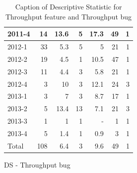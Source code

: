 \documentclass[UKenglish]{ifimaster}  %
\begin{document}
\begin{appendices}
\begin{table}[!htbp]
\begin{adjustwidth}{-2.5cm}{}
\begin{subfigure}[b]{0.3\textwidth}
{\begin{tabular}{ | l | r | r | r | r | r | r | }
 2011-4  & 14 & 13.6 & 5 & 17.3 & 49 & 1 \\ \hline
 2012-1  & 33 & 5.3 & 5 & 5 & 21 & 1 \\ \hline
 2012-2  & 19 & 4.5 & 1 & 10.5 & 47 & 1 \\ \hline
 2012-3  & 11 & 4.4 & 3 & 5.8 & 21 & 1 \\ \hline
 2012-4  & 3 & 10 & 3 & 12.1 & 24 & 3 \\ \hline
 2013-1  & 3 & 7 & 3 & 8.7 & 17 & 1 \\ \hline
 2013-2  & 5 & 13.4 & 13 & 7.1 & 21 & 3 \\ \hline
 2013-3  & 1 & 1 & 1 & - & 1 & 1 \\ \hline
 2013-4  & 5 & 1.4 & 1 & 0.9 & 3 & 1 \\ \hline
 Total  & 108 & 6.4 & 3 & 9.6 & 49 & 1 \\ \hline
\end{tabular}
}
\caption{DS - Throughput bug}
 \label{DS:TPB:1}
\end{subfigure}
\end{adjustwidth}
\caption[Optional caption for list of figures]{Caption of Descriptive Statistic for Throughput feature and Throughput bug}
\label{DS:1:2}
\end{table}




\end{appendices}
\end{document}

